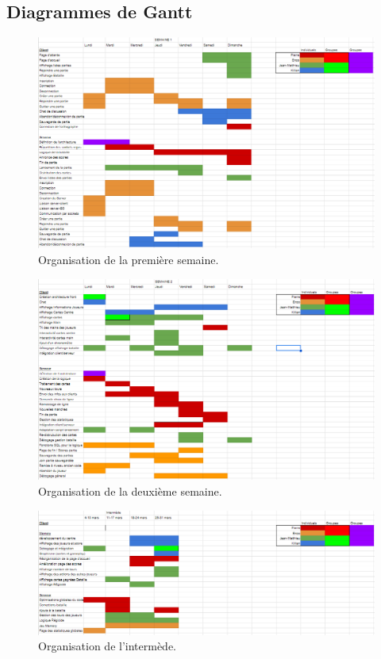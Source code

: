 \documentclass[a4paper]{article}
\begin{document}
\subsection{Diagrammes de Gantt}

\begin{figure}[ht]
\centering
\includegraphics[width=1\textwidth]{semaine1.png}
\caption{Organisation de la première semaine.}
\label{fig:bdd}
\end{figure}

\begin{figure}[ht]
\centering
\includegraphics[width=1\textwidth]{semaine2.png}
\caption{Organisation de la deuxième semaine.}
\label{fig:bdd}
\end{figure}
\begin{figure}[ht]
\centering
\includegraphics[width=1\textwidth]{intermede.png}
\caption{Organisation de l'intermède.}
\label{fig:bdd}
\end{figure}
    
\end{document}
